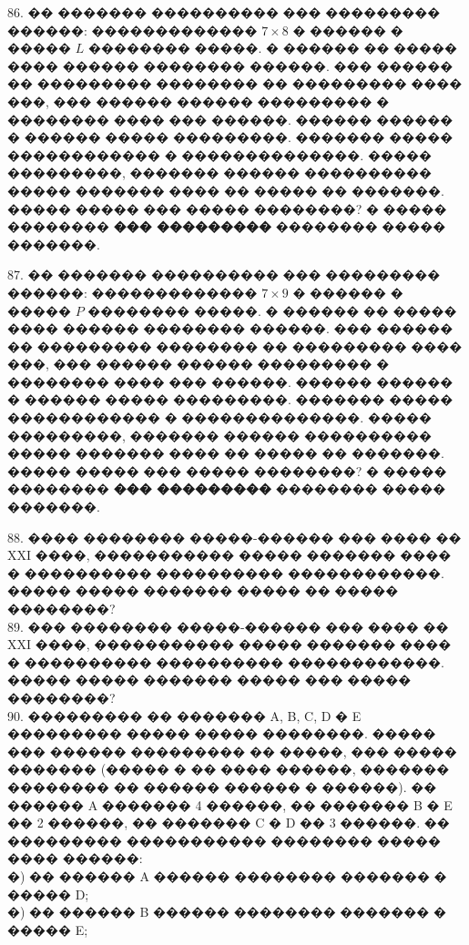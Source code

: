 \documentclass[12pt]{article}
\begin{document}
86. �� ������� ���������� ��� ��������� ������: ������������� $7\times8$ � ������ � ����� $L$ �������� �����. � ������ �� ����� ���� ������ �������� ������. ��� ������ �� ��������� �������� �� ��������� ���� ���, ��� ������ ������ ��������� � �������� ���� ��� ������. ������ ������ � ������ ����� ���������. ������� ����� ������������ � ��������������. ����� ���������, ������� ������ ���������� ����� ������� ���� �� ����� �� �������. ����� ����� ��� ����� ��������? � ����� �������� {\bf ��� ���������} �������� ����� �������.
\begin{center}
\begin{figure}[ht!]
\end{figure}
\end{center}
87. �� ������� ���������� ��� ��������� ������: ������������� $7\times9$ � ������ � ����� $P$ �������� �����. � ������ �� ����� ���� ������ �������� ������. ��� ������ �� ��������� �������� �� ��������� ���� ���, ��� ������ ������ ��������� � �������� ���� ��� ������. ������ ������ � ������ ����� ���������. ������� ����� ������������ � ��������������. ����� ���������, ������� ������ ���������� ����� ������� ���� �� ����� �� �������. ����� ����� ��� ����� ��������? � ����� �������� {\bf ��� ���������} �������� ����� �������.
\begin{center}
\begin{figure}[ht!]
\end{figure}
\end{center}
88. ���� �������� �����-������ ��� ���� �� XXI ����, ����������� ����� ������� ���� � ���������� ���������� ������������. ����� ����� ������� ����� �� ����� ��������?\\
89. ��� �������� �����-������ ��� ���� �� XXI ����, ����������� ����� ������� ���� � ���������� ���������� ������������. ����� ����� ������� ����� ��� ����� ��������?\\
90. ��������� �� ������� A, B, C, D � E ��������� ����� ����� ��������. ����� ��� ������ ��������� �� �����, ��� ����� ������� (����� � �� ���� ������, ������� �������� �� ������ ������ � ������). �� ������ A ������� 4 ������, �� ������� B � E �� 2 ������, �� ������� C � D �� 3 ������. �� ��������� ����������� �������� ����� ���� ������:\\
�) �� ������ A ������ �������� ������� � ����� D;\\
�) �� ������ B ������ �������� ������� � ����� E;\\
\end{document}
